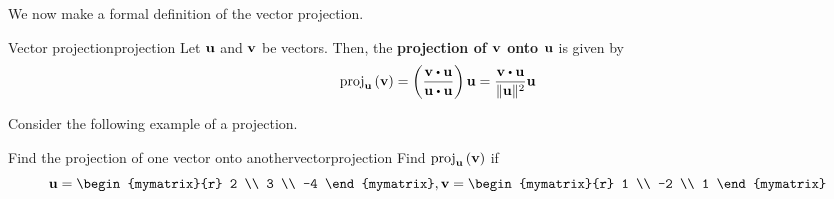 We now make a formal definition of the vector projection.

\begin{definition}{Vector projection}{projection}
Let ${\bf u}$ and ${\bf v}$ be vectors. Then, the \textbf{projection of ${\bf v}$ onto
${\bf u}$} is given by 
\begin{equation*}
\func{proj}_{\vect{u}}\tup{\vect{v}} =\tup{\vspace{0.05in}
\frac{\vect{v}\dotprod \vect{u}}{\vect{u}\dotprod \vect{u}}} \vect{u}
=
\frac{\vect{v}\dotprod \vect{u}}{\vectlength \vect{u}\vectlength ^{2}}\vect{u}
\end{equation*}
\end{definition}

Consider the following example of a projection.

\begin{example}{Find the projection of one vector onto another}{vectorprojection}
Find 
$\mbox{proj}_{{\bf u}}\left({\bf v}\right) $ if 
\begin{equation*}
\vect{u}=
\begin{mymatrix}{r}
2 \\
3 \\
-4
\end{mymatrix},
\vect{v}=
\begin{mymatrix}{r}
1 \\
-2 \\
1
\end{mymatrix}
\end{equation*}
\end{example}

